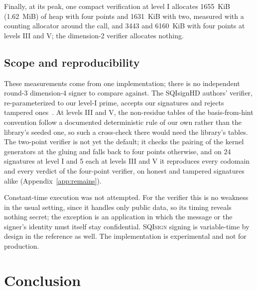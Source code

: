 \documentclass[version=preprint]{iacrcc}
\newcommand{\SQIsign}{SQI{\textsc{sign}}}
\begin{document}
    Finally, at its peak, one compact verification at level I allocates
    1655~KiB (1.62~MiB) of heap with four points and 1631~KiB with two,
    measured with a counting allocator around the call, and 3443 and 6160~KiB
    with four points at levels III and V; the dimension-2 verifier allocates
    nothing.

    \subsection{Scope and reproducibility}
    \label{sec:scope}
    These measurements come from one implementation; there is no independent
    round-3 dimension-4 signer to compare against. The SQIsignHD authors'
    verifier, re-parameterized to our level-I prime, accepts our signatures and
    rejects tampered ones~\cite{DLRW25}. At levels III and V, the non-residue
    tables of the basis-from-hint convention follow a documented deterministic
    rule of our own rather than the library's seeded one, so such a cross-check
    there would need the library's tables.   The
    two-point verifier is not yet the default; it checks the pairing of the
    kernel generators at the gluing and falls back to four points otherwise, and
    on 24 signatures at level I and 5 each at levels III and V it reproduces
    every codomain and every verdict of the four-point verifier, on honest and
    tampered signatures alike (Appendix~\ref{app:remains}).

    Constant-time execution was not attempted. For the verifier this is no
    weakness in the usual setting, since it handles only public data, so its
    timing reveals nothing secret; the exception is an application in which
    the message or the signer's identity must itself stay confidential.
    {\SQIsign} signing is variable-time by design in the reference as well. The
    implementation is experimental and not for production.

    \section{Conclusion}
    \label{sec:conc}
\end{document}
